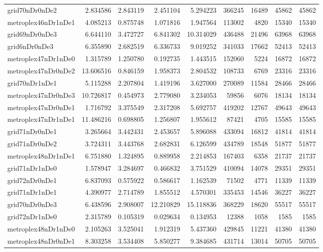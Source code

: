 \documentclass[../../../thesis.tex]{subfiles}
\begin{document}
\begin{longtable}{|l|r|r|r|r|r|r|r|r|}
grid70nDr0nDe2 & 2.834586 & 2.843119 & 2.451104 & 5.294223 & 366245 & 16489 & 45862 & 45862 \\
metroplex46nDr1nDe1 & 4.085213 & 0.875748 & 1.071816 & 1.947564 & 113002 & 4820 & 15340 & 15340 \\
grid69nDr0nDe3 & 6.644110 & 3.472727 & 6.841302 & 10.314029 & 436488 & 21496 & 63968 & 63968 \\
grid6nDr0nDe3 & 6.355890 & 2.682519 & 6.336733 & 9.019252 & 341033 & 17662 & 52413 & 52413 \\
metroplex47nDr1nDe0 & 1.315789 & 1.250780 & 0.192735 & 1.443515 & 152060 & 5224 & 16872 & 16872 \\
metroplex47nDr0nDe2 & 13.606516 & 0.846159 & 1.958373 & 2.804532 & 108733 & 6769 & 23316 & 23316 \\
grid70nDr1nDe1 & 5.115288 & 2.207804 & 1.419196 & 3.627000 & 270089 & 11584 & 28466 & 28466 \\
metroplex47nDr0nDe3 & 10.726817 & 0.454973 & 2.779080 & 3.234053 & 59856 & 6076 & 18134 & 18134 \\
metroplex47nDr0nDe1 & 1.716792 & 3.375549 & 2.317208 & 5.692757 & 419202 & 12767 & 49643 & 49643 \\
metroplex47nDr1nDe1 & 11.486216 & 0.698805 & 1.256807 & 1.955612 & 87421 & 4705 & 15585 & 15585 \\
grid71nDr0nDe1 & 3.265664 & 3.442431 & 2.453657 & 5.896088 & 433094 & 16812 & 41814 & 41814 \\
grid71nDr0nDe2 & 3.724311 & 3.443768 & 2.682831 & 6.126599 & 434789 & 18548 & 51877 & 51877 \\
metroplex48nDr1nDe1 & 6.751880 & 1.324895 & 0.889958 & 2.214853 & 167403 & 6358 & 21737 & 21737 \\
grid71nDr1nDe0 & 1.578947 & 3.284697 & 0.466832 & 3.751529 & 410094 & 14078 & 29351 & 29351 \\
grid72nDr0nDe1 & 6.837093 & 0.575922 & 0.586617 & 1.162539 & 71502 & 4771 & 11339 & 11339 \\
grid71nDr1nDe1 & 4.390977 & 2.714789 & 1.855512 & 4.570301 & 335453 & 14546 & 36227 & 36227 \\
grid70nDr0nDe3 & 6.438596 & 2.908007 & 12.210829 & 15.118836 & 368229 & 18620 & 55517 & 55517 \\
grid72nDr1nDe0 & 2.315789 & 0.105319 & 0.029634 & 0.134953 & 12388 & 1058 & 1585 & 1585 \\
metroplex48nDr1nDe0 & 2.105263 & 3.525041 & 1.912319 & 5.437360 & 429845 & 11221 & 41380 & 41380 \\
metroplex48nDr0nDe1 & 8.303258 & 3.534408 & 5.850277 & 9.384685 & 431714 & 13014 & 50705 & 50705 \\

\end{longtable}
\end{document}
